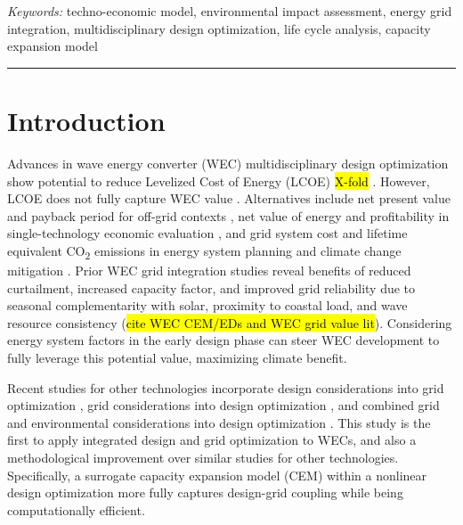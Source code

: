 \documentclass[10pt,twoside]{article}
\begin{document}
\vspace{.5\baselineskip}
\textit{Keywords:} techno-economic model, environmental impact assessment, energy grid integration, multidisciplinary design optimization, life cycle analysis, capacity expansion model

\noindent\rule{\textwidth}{0.4pt}

\section{Introduction}
Advances in wave energy converter (WEC) multidisciplinary design optimization show potential to reduce Levelized Cost of Energy (LCOE) \hl{X-fold} \cite{mccabe_leveraging_2025}.
However, LCOE does not fully capture WEC value \cite{mowers_evaluation_2021,moraski_beyond_2025}.
Alternatives include net present value and payback period for off-grid contexts \cite{jenne_powering_2021}, net value of energy and profitability in single-technology economic evaluation \cite{mowers_evaluation_2021,makaremi_economic_2025}, and grid system cost and lifetime equivalent CO\textsubscript{2} emissions in energy system planning and climate change mitigation \cite{moraski_beyond_2025}.
Prior WEC grid integration studies reveal benefits of reduced curtailment, increased capacity factor, and improved grid reliability due to seasonal complementarity with solar, proximity to coastal load, and wave resource consistency (\hl{cite WEC CEM/EDs and WEC grid value lit}).
Considering energy system factors in the early design phase can steer WEC development to fully leverage this potential value, maximizing climate benefit.

Recent studies for other technologies incorporate design considerations into grid optimization \cite{schwartz_value_2023,ricks_value_2022}, grid considerations into design optimization \cite{mehta_designing_2024}, and combined grid and environmental considerations into design optimization \cite{canet_eco-conscious_2023,kainz_how_2024}.
This study is the first to apply integrated design and grid optimization to WECs, and also a methodological improvement over similar studies for other technologies. 
Specifically, a surrogate capacity expansion model (CEM) within a nonlinear design optimization more fully captures design-grid coupling while being computationally efficient.
\end{document}
